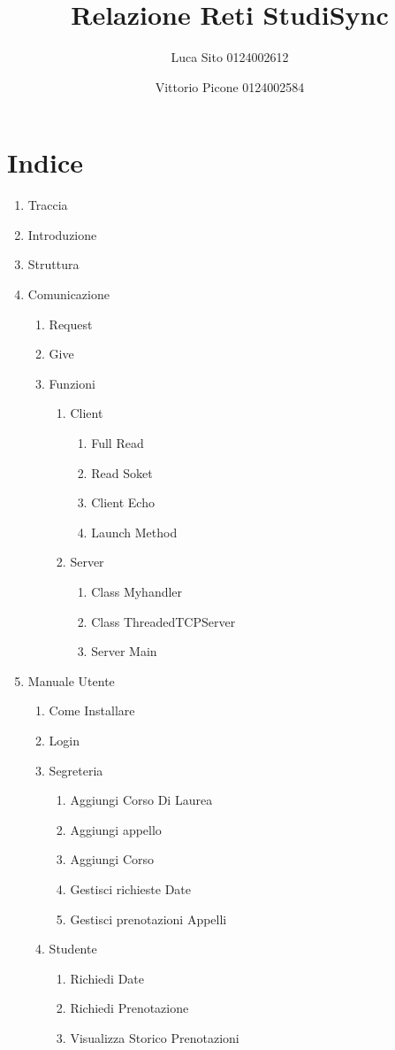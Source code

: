 \documentclass{article}
\title{Relazione Reti StudiSync}
\author{Luca Sito 0124002612
\and Vittorio Picone 0124002584}
\begin{document}
\maketitle

\section{Indice}
\begin{enumerate}
    \item Traccia
    \item Introduzione
    \item Struttura
    \item Comunicazione
    \begin{enumerate}
        \item Request
        \item Give
        \item Funzioni
        \begin{enumerate}
            \item Client
            \begin{enumerate}
                \item Full Read
                \item Read Soket
                \item Client Echo
                \item Launch Method
            \end{enumerate}
        \item Server
        \begin{enumerate}
            \item Class Myhandler
            \item Class ThreadedTCPServer
            \item Server Main
        \end{enumerate}
        \end{enumerate}
       
\end{enumerate}
\item Manuale Utente
\begin{enumerate}
    \item Come Installare
    \item Login
    \item Segreteria
    \begin{enumerate}
        \item Aggiungi Corso Di Laurea
        \item Aggiungi appello
        \item Aggiungi Corso
        \item Gestisci richieste Date
        \item Gestisci prenotazioni Appelli
\end{enumerate}
\item Studente
\begin{enumerate}
    \item Richiedi Date 
    \item Richiedi Prenotazione
    \item Visualizza Storico Prenotazioni
\end{enumerate}




\end{enumerate}
\end{enumerate}
\end{document}
